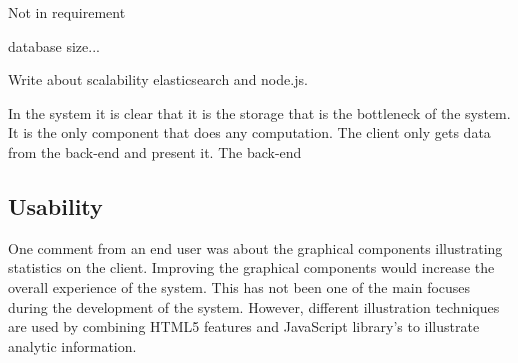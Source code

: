 Not in requirement

database size...

Write about scalability elasticsearch and node.js.

In the system it is clear that it is the storage that is the bottleneck of the system. It is the only component that does any computation. The client only gets data from the back-end and present it. The back-end 

\subsection{Usability}

One comment from an end user was about the graphical components illustrating statistics on the client. Improving the graphical components would increase the overall experience of the system. This has not been one of the main focuses during the development of the system. However, different illustration techniques are used by combining HTML5 features and JavaScript library's to illustrate analytic information. 







